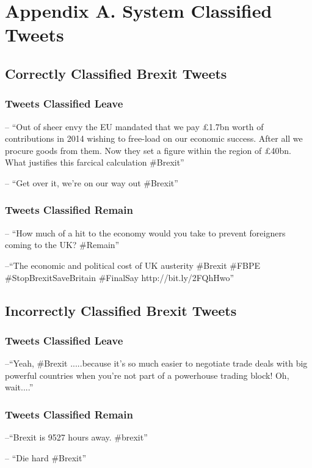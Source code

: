 \documentclass[11pt]{report}
\begin{document}
\section*{Appendix A. System Classified Tweets}

\subsection*{Correctly Classified Brexit Tweets}

\subsubsection*{Tweets Classified Leave}
-- ``Out of sheer envy the EU mandated that we pay \pounds1.7bn worth of contributions in 2014 wishing to free-load on our economic success. After all we procure goods from them. Now they set a figure within the region of \pounds40bn. What justifies this farcical calculation \#Brexit''

-- ``Get over it, we're on our way out \#Brexit''

\subsubsection*{Tweets Classified Remain}
-- ``How much of a hit to the economy would you take to prevent foreigners coming to the UK? \#Remain''

--``The economic and political cost of UK austerity \#Brexit \#FBPE \#StopBrexitSaveBritain \#FinalSay http://bit.ly/2FQhHwo''
\subsection*{Incorrectly Classified Brexit Tweets}

\subsubsection*{Tweets Classified Leave}
--``Yeah, \#Brexit .....because it's so much easier to negotiate trade deals with big powerful countries when you're not part of a powerhouse trading block! Oh, wait....''

\subsubsection*{Tweets Classified Remain}
--``Brexit is 9527 hours away. \#brexit''

-- ``Die hard \#Brexit''
\end{document}
